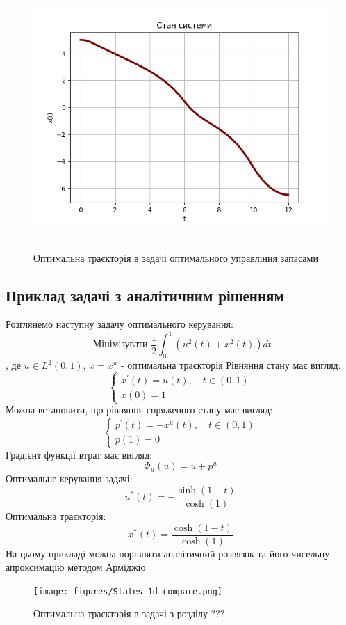 \documentclass[a4paper,12pt]{extreport}
\begin{document}
\begin{figure}[H]
\centering
\includegraphics[height=10cm, width=15cm]{figures/State_1d_optimal_stock_management.png}
\caption{Оптимальна траєкторія в задачі оптимального управління запасами}
\label{im:1.2}
\end{figure}

\subsection{Приклад задачі з аналітичним рішенням}
Розглянемо наступну задачу оптимального керування:
$$ \text { Мінімізувати } \frac{1}{2} \int_0^1\left(u^2(t)+x^2(t)\right) d t $$, де
$u \in L^2(0,1)$, $x=x^u$ - оптимальна траєкторія
Рівняння стану має вигляд:
$$
\left\{\begin{array}{l}
    x^{\prime}(t)=u(t), \quad t \in(0,1) \\
    x(0)=1
    \end{array}\right.
$$
Можна встановити, що рівняння спряженого стану має вигляд:
$$
\left\{\begin{array}{l}
    p^{\prime}(t)=-x^u(t), \quad t \in(0,1) \\
    p(1)=0
    \end{array}\right.
$$
Градієнт функції втрат має вигляд:
$$\Phi_u(u)=u+p^u $$
Оптимальне керування задачі:
$$ u^*(t)=-\frac{\sinh (1-t)}{\cosh (1)} $$
Оптимальна траєкторія:
$$
x^*(t)=\frac{\cosh (1-t)}{\cosh (1)}
$$ 
На цьому прикладі можна порівняти аналітичний розвязок та його чисельну апроксимацію методом Арміджіо
\begin{figure}[H]
    \centering
\texttt{[image: figures/States\_1d\_compare.png]} 
\caption{Оптимальна траєкторія в задачі з розділу ???}
\label{im:2.1}
\end{figure}
\end{document}
